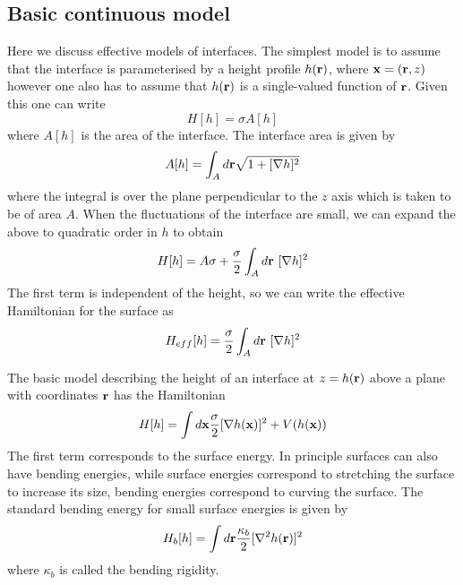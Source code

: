 \subsection{Basic continuous model}

Here we discuss effective models of interfaces. The simplest model is to assume that the 
interface is parameterised by a height profile $h({\bf r})$, where ${\bf x} = ({\bf r},z)$ however one also has to assume that 
$h({\bf r})$ is a single-valued function of ${\bf r}$. Given this one can write
\begin{equation}
H[h] = \sigma A[h]
\end{equation}
where $A[h]$ is the area of the interface. The interface area is given by
\begin{equation}
A[h] = \int_A d{\bf r}\sqrt{1+[\nabla h]^2}
\end{equation}
where the integral is over the plane perpendicular to the $z$ axis which is taken to be of area $A$. When the fluctuations of the interface are small, we can expand the above to quadratic order in $h$ to obtain
\begin{equation}
H[h]= A\sigma +\frac{\sigma}{2} \int_A d{\bf r} \ [\nabla h]^2
\end{equation}
The first term is independent of the height, so we can write the effective Hamiltonian for the surface as
\begin{equation}
H_{eff} [h]= \frac{\sigma}{2} \int_A d\br\ [\nabla h]^2
\label{heff}
\end{equation}

The basic model describing the height of an interface at $z=h({\bf r})$ above a plane with coordinates ${\bf r}$ has the Hamiltonian 
\begin{equation}
H[h] = \int d{\bf x}\frac{\sigma}{2} [\nabla h({\bf x})]^2 + V(h({\bf x}))
\end{equation}
The first term corresponds to the surface energy. In principle surfaces can also have bending energies, while surface energies correspond to stretching the surface to increase its size, bending energies correspond to curving the surface. The standard bending energy for small surface energies \cite{diehl_interface_1980} is given by
\begin{equation}
H_b[h] = \int d{\bf r} \frac{\kappa_b}{2}[\nabla^2 h({\bf r})]^2
\end{equation} 
where $\kappa_b$ is called the bending rigidity.

